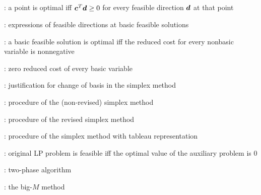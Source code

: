 \subsection*{}
\item {}: a point is optimal iff
\(\bm{c}^{T}\bm{d}\ge 0\) for every feasible direction \(\bm{d}\) at that
point
\item {}: expressions of feasible directions at basic feasible solutions
\item {}: a basic feasible solution is optimal iff the
reduced cost for every nonbasic variable is nonnegative
\item {}: zero reduced cost of every basic variable
\item {}: justification for change of basis in the simplex method
\item {}: procedure of the (non-revised) simplex method
\item {}: procedure of the revised simplex method
\item {}: procedure of the simplex method with tableau representation
\item {}: original LP problem is feasible iff the optimal value of the auxiliary problem is \(0\)
\item {}: two-phase algorithm
\item {}: the big-\(M\) method
